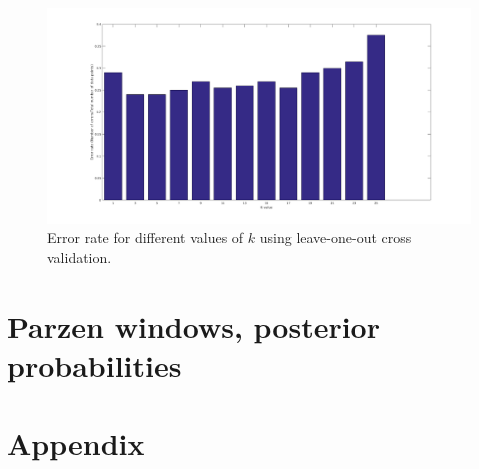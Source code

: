 \documentclass[10pt]{article}
\begin{document}
\begin{figure}[H]
 \centering
 \includegraphics[width=\textwidth]{assign2_3.png}
 \caption{Error rate for different values of $k$ using leave-one-out cross validation.}
 \label{fig2.3}
\end{figure}

\subsection{}

\section{Parzen windows, posterior probabilities}

\section*{Appendix}




\end{document}
